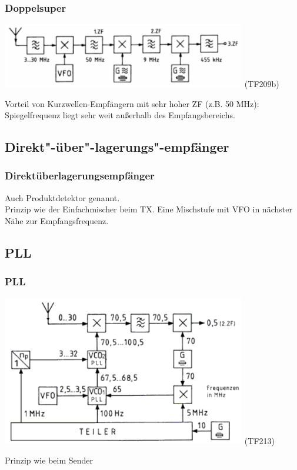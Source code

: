 \begin{frame}
  \frametitle{Doppelsuper}

  \begin{center}
    \includegraphics[width=0.8\textwidth,height=.5\textheight,keepaspectratio]{a13/TF209b.png}
    {\tiny (TF209b)}
  \end{center}

  Vorteil von Kurzwellen-Empfängern mit sehr hoher ZF (z.B. 50 MHz):
  Spiegelfrequenz liegt sehr weit außerhalb des Empfangsbereichs.

\end{frame}


\subsection{Direkt"-über"-lagerungs"-empfänger}

\begin{frame}
  \frametitle{Direktüberlagerungsempfänger}

  Auch Produktdetektor genannt. \\[2em]

  Prinzip wie der Einfachmischer beim TX. Eine Mischstufe mit VFO in nächster
  Nähe zur Empfangsfrequenz.

\end{frame}

\subsection{PLL}

\begin{frame}
  \frametitle{PLL}

  \begin{center}
    \includegraphics[width=0.8\textwidth,height=.7\textheight,keepaspectratio]{a13/TF213.png}
    {\tiny (TF213)}
  \end{center}

  Prinzip wie beim Sender
\end{frame}

